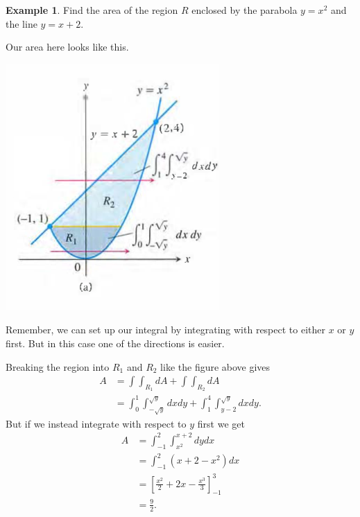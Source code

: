 \documentclass[12pt, letter]{article}
\theoremstyle{plain}
\numberwithin{theorem}{section}
\theoremstyle{definition}
\newtheorem{example}[theorem]{Example}
\begin{document}
\bigskip

\hrulefill

\bigskip

\begin{example}
Find the area of the region $R$ enclosed by the parabola $y=x^2$ and the line $y=x+2$.

\bigskip

Our area here looks like this.

\bigskip

\begin{center}
\includegraphics[scale=0.7]{m3_f10}
\end{center}

\bigskip

Remember, we can set up our integral by integrating with respect to either $x$ or $y$ first. But in this case one of the directions is easier.

\smallskip

Breaking the region into $R_1$ and $R_2$ like the figure above gives
\begin{align*}
A &= \int \int_{R_1} dA + \int \int_{R_2} dA\\
&= \int_0^1 \int_{-\sqrt{y}}^{\sqrt{y}} dxdy + \int_1^4 \int_{y-2}^{\sqrt{y}} dx dy.
\end{align*}
But if we instead integrate with respect to $y$ first we get
\begin{align*}
A &= \int_{-1}^2 \int_{x^2}^{x+2} dy dx\\
&= \int_{-1}^2 (x+2-x^2)dx\\
&=\left[\frac{x^2}{2}+2x-\frac{x^3}{3}\right]_{-1}^3\\
&= \frac{9}{2}.
\end{align*}

\end{example}
\end{document}
